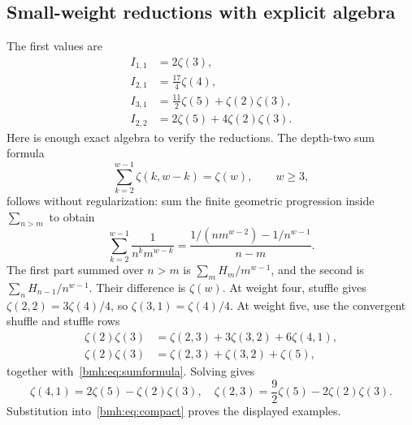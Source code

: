 \subsection{Small-weight reductions with explicit algebra}
The first values are
\begin{align}
 I_{1,1}&=2\zeta(3),\label{bmh:eq:example11}\\
 I_{2,1}&=\frac{17}{4}\zeta(4),\label{bmh:eq:example21}\\
 I_{3,1}&=\frac{11}{2}\zeta(5)+\zeta(2)\zeta(3),\label{bmh:eq:example31}\\
 I_{2,2}&=2\zeta(5)+4\zeta(2)\zeta(3).\label{bmh:eq:example22}
\end{align}
Here is enough exact algebra to verify the reductions. The depth-two sum
formula
\begin{equation}\label{bmh:eq:sumformula}
 \sum_{k=2}^{w-1}\zeta(k,w-k)=\zeta(w),\qquad w\ge3,
\end{equation}
follows without regularization: sum the finite geometric progression
inside $\sum_{n>m}$ to obtain
\[
 \sum_{k=2}^{w-1}\frac1{n^k m^{w-k}}
 =\frac{1/(n m^{w-2})-1/n^{w-1}}{n-m}.
\]
The first part summed over $n>m$ is
$\sum_m H_m/m^{w-1}$, and the second is
$\sum_n H_{n-1}/n^{w-1}$. Their difference is $\zeta(w)$.
At weight four, stuffle gives $\zeta(2,2)=3\zeta(4)/4$, so
$\zeta(3,1)=\zeta(4)/4$. At weight five, use the convergent shuffle
and stuffle rows
\begin{align*}
 \zeta(2)\zeta(3)&=\zeta(2,3)+3\zeta(3,2)+6\zeta(4,1),\\
 \zeta(2)\zeta(3)&=\zeta(2,3)+\zeta(3,2)+\zeta(5),
\end{align*}
together with~\eqref{bmh:eq:sumformula}. Solving gives
\[
 \zeta(4,1)=2\zeta(5)-\zeta(2)\zeta(3),\quad
 \zeta(2,3)=\frac92\zeta(5)-2\zeta(2)\zeta(3).
\]
Substitution into~\eqref{bmh:eq:compact} proves the displayed examples.
